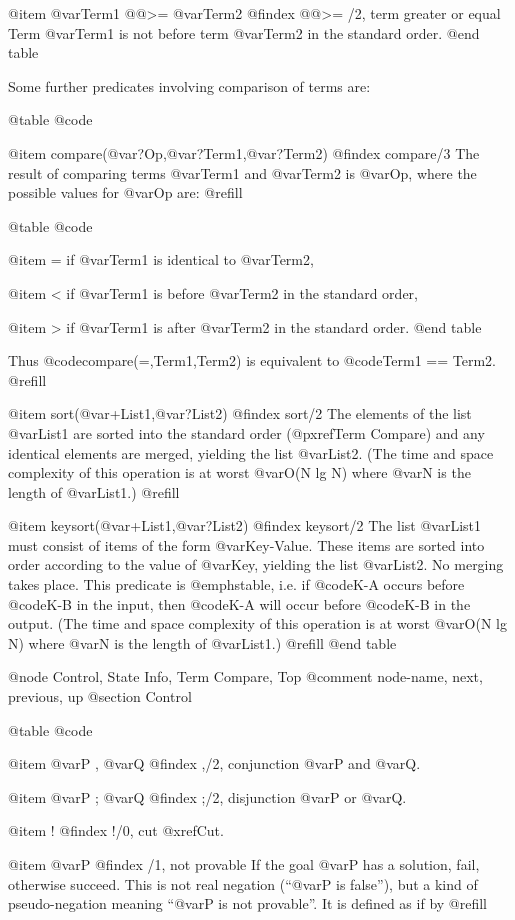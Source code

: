 @item @var{Term1} @@>= @var{Term2}
@findex @@>= /2, term greater or equal
Term @var{Term1} is not before term @var{Term2} in the standard order.
@end table

Some further predicates involving comparison of terms are:

@table @code

@item compare(@var{?Op},@var{?Term1},@var{?Term2})
@findex compare/3
The result of comparing terms @var{Term1} and @var{Term2} is @var{Op},
where the possible values for @var{Op} are: @refill

@table @code

@item =
if @var{Term1} is identical to @var{Term2},

@item <
if @var{Term1} is before @var{Term2} in the standard order,

@item >
if @var{Term1} is after @var{Term2} in the standard order.
@end table

Thus @code{compare(=,Term1,Term2)} is equivalent to
@code{Term1 == Term2}. @refill

@item sort(@var{+List1},@var{?List2})
@findex sort/2
The elements of the list @var{List1} are sorted into the standard order
(@pxref{Term Compare}) and any identical elements are merged, yielding
the list @var{List2}.  (The time and space complexity of this operation
is at worst @var{O(N lg N)} where @var{N} is the length of @var{List1}.)
@refill

@item keysort(@var{+List1},@var{?List2})
@findex keysort/2
The list @var{List1} must consist of items of the form @var{Key-Value}.
These items are sorted into order according to the value of @var{Key},
yielding the list @var{List2}.  No merging takes place.  This predicate is
@emph{stable}, i.e. if @code{K-A} occurs before @code{K-B} in the input,
then @code{K-A} will occur before @code{K-B} in the output.  (The time
and space complexity of this operation is at worst @var{O(N lg N)} where
@var{N} is the length of @var{List1}.)
@refill
@end table

@node Control, State Info, Term Compare, Top
@comment  node-name,  next,  previous,  up
@section Control

@table @code

@item @var{P} , @var{Q}
@findex ,/2, conjunction
@var{P} and @var{Q}.

@item @var{P} ; @var{Q}
@findex ;/2, disjunction
@var{P} or @var{Q}.

@item !
@findex !/0, cut
@xref{Cut}.

@item \+ @var{P}
@findex \+ /1, not provable
If the goal @var{P} has a solution, fail, otherwise succeed.  This is not
real negation (``@var{P} is false''), but a kind of pseudo-negation
meaning ``@var{P} is not provable''.  It is defined as if by @refill

